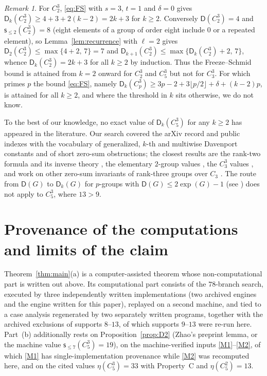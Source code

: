 \documentclass[11pt]{article}
\theoremstyle{definition}
\theoremstyle{remark}
\newtheorem{remark}[theorem]{Remark}
\newcommand{\Dk}{\mathsf{D}}
\newcommand{\C}{C_5^{3}}
\newcommand{\sle}[1]{\mathsf{s}_{\le #1}}
\begin{document}
\begin{remark}\label{rem:C23}
For $C_2^3$, \eqref{eq:FS} with $s=3$, $t=1$ and $\delta=0$ gives $\Dk_k(C_2^3)\ge4+3+2(k-2)=2k+3$ for $k\ge2$. Conversely $\Dk(C_2^3)=4$ and $\sle{2}(C_2^3)=8$ (eight elements of a group of order eight include $0$ or a repeated element), so Lemma~\ref{lem:recurrence} with $\ell=2$ gives $\Dk_2(C_2^3)\le\max\{4+2,\,7\}=7$ and $\Dk_{k+1}(C_2^3)\le\max\{\Dk_k(C_2^3)+2,\,7\}$, whence $\Dk_k(C_2^3)=2k+3$ for all $k\ge2$ by induction. Thus the Freeze--Schmid bound is attained from $k=2$ onward for $C_2^3$ and $\C$ but not for $C_3^3$. For which primes $p$ the bound \eqref{eq:FS}, namely $\Dk_k(C_p^3)\ge3p-2+3\lfloor p/2\rfloor+\delta+(k-2)p$, is attained for all $k\ge2$, and where the threshold in $k$ sits otherwise, we do not know.
\end{remark}

To the best of our knowledge, no exact value of $\Dk_k(\C)$ for any $k\ge2$ has appeared in the literature. Our search covered the arXiv record and public indexes with the vocabulary of generalized, $k$-th and multiwise Davenport constants and of short zero-sum obstructions; the closest results are the rank-two formula and its inverse theory \cite{Zhong2025}, the elementary $2$-group values \cite{DelormeOrdazQuiroz2001,FreezeSchmid2010}, the $C_3^3$ values \cite{BhowmikSchlagePuchta2007}, and work on other zero-sum invariants of rank-three groups over $C_3$ \cite{Zhang2023}. The route from $\Dk(G)$ to $\Dk_k(G)$ for $p$-groups with $\Dk(G)\le2\exp(G)-1$ (see \cite[Section~6.1]{GeroldingerHalterKoch2006}) does not apply to $\C$, where $13>9$.

\section{Provenance of the computations and limits of the claim}\label{sec:deferred}

Theorem~\ref{thm:main}(a) is a computer-assisted theorem whose non-computational part is written out above. Its computational part consists of the $78$-branch search, executed by three independently written implementations (two archived engines and the engine written for this paper), replayed on a second machine, and tied to a case analysis regenerated by two separately written programs, together with the archived exclusions of supports $8$--$13$, of which supports $9$--$13$ were re-run here. Part~(b) additionally rests on Proposition~\ref{prop:D2} (Zhao's preprint lemma, or the machine value $\sle{7}(\C)=19$), on the machine-verified inputs \ref{M1}--\ref{M2}, of which \ref{M1} has single-implementation provenance while \ref{M2} was recomputed here, and on the cited values $\eta(\C)=33$ with Property~C and $\eta(C_5^2)=13$.
\end{document}
